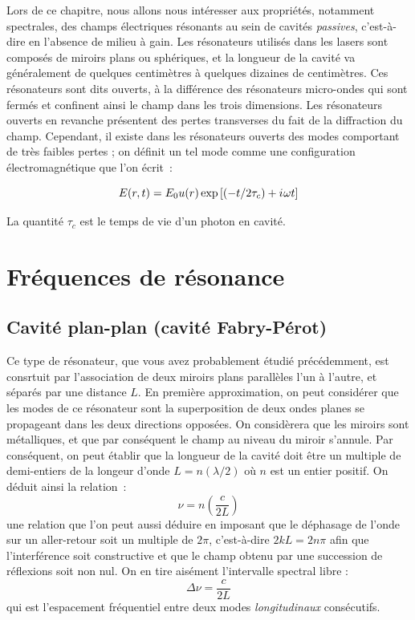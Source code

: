 \documentclass[a4paper]{book}
\newcommand{\iu}{{i\mkern1mu}}
\begin{document}
Lors de ce chapitre, nous allons nous intéresser aux propriétés, notamment spectrales, des champs électriques résonants au sein de cavités \textit{passives}, c'est-à-dire en l'absence de milieu à gain. 
Les résonateurs utilisés dans les lasers sont composés de miroirs plans ou sphériques, et la longueur de la cavité va généralement de quelques centimètres à quelques dizaines de centimètres. 
Ces résonateurs sont dits ouverts, à la différence des résonateurs micro-ondes qui sont fermés et confinent ainsi le champ dans les trois dimensions. Les résonateurs ouverts en revanche présentent des pertes transverses du fait de la diffraction du champ. Cependant, il existe dans les résonateurs ouverts des modes comportant de très faibles pertes ; on définit un tel mode comme une configuration électromagnétique que l'on écrit~:

\begin{equation}
    E(r,t)=E_0u(r)\exp\left[(-t/2\tau_c)+\iu \omega t\right]
\end{equation}

La quantité $\tau_c$ est le temps de vie d'un photon en cavité.

\section{Fréquences de résonance}

\subsection{Cavité plan-plan (cavité Fabry-Pérot)}
Ce type de résonateur, que vous avez probablement étudié précédemment, est consrtuit par l'association de deux miroirs plans parallèles l'un à l'autre, et séparés par une distance $L$. En première approximation, on peut considérer que les modes de ce résonateur sont la superposition de deux ondes planes se propageant dans les deux directions opposées. On considèrera que les miroirs sont métalliques, et que par conséquent le champ au niveau du miroir s'annule. Par conséquent, on peut établir que la longueur de la cavité doit être un multiple de demi-entiers de la longeur d'onde $L = n(\lambda/2)$ où $n$ est un entier positif. On déduit ainsi la relation~:
\begin{equation}
    \nu = n\left(\frac{c}{2L}\right)
    \label{eq:FP}
\end{equation}
une relation que l'on peut aussi déduire en imposant que le déphasage de l'onde sur un aller-retour soit un multiple de $2\pi$, c'est-à-dire $2kL=2n\pi$ afin que l'interférence soit constructive et que le champ obtenu par une succession de réflexions soit non nul. 
On en tire aisément l'intervalle spectral libre : 
\begin{equation}
    \Delta\nu = \frac{c}{2L}
\end{equation}
qui est l'espacement fréquentiel entre deux modes \textit{longitudinaux} consécutifs.
\end{document}
